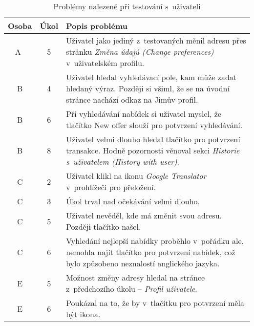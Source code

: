 \begin{table}[h]
    \caption{Problémy nalezené při testování s~uživateli}\label{tab:test-results}
    \begin{tabulary}{1.0\textwidth}{|c|c|L|}
        \hline
        \textbf{Osoba} & \textbf{Úkol} & \textbf{Popis problému} \\ \hline\hline
        A~& 5 & Uživatel jako jediný z~testovaných měnil adresu přes stránku \textit{Změna údajů (Change preferences)} v~uživatelském profilu. \\ \hline

        B & 4 & Uživatel hledal vyhledávací pole, kam může zadat hledaný výraz. Později si všiml, že se na úvodní stránce nachází odkaz na Jimův profil. \\ \hline
        B & 6 & Při vyhledávání nabídek si uživatel myslel, že tlačítko New offer slouží pro potvrzení vyhledávání. \\ \hline
        B & 8 & Uživatel velmi dlouho hledal tlačítko pro potvrzení transakce. Hodně pozornosti věnoval sekci \textit{Historie s~uživatelem (History with user)}. \\ \hline

        C & 2 & Uživatel klikl na ikonu \textit{Google Translator} v~prohlížeči pro přeložení.  \\ \hline
        C & 3 & Úkol trval nad očekávání velmi dlouho.  \\ \hline
        C & 5 & Uživatel nevěděl, kde má změnit svou adresu. Později tlačítko našel.  \\ \hline
        C & 6 & Vyhledání nejlepší nabídky proběhlo v~pořádku ale, nemohla najít tlačítko pro potvrzení nabídek, což bylo způsobeno neznalostí anglického jazyka. \\ \hline

        E & 5 & Možnost změny adresy hledal na stránce z~předchozího úkolu -- \textit{Profil uživatele}.  \\ \hline
        E & 6 & Poukázal na to, že by v~tlačítku pro potvrzení měla být ikona.  \\ \hline
    \end{tabulary}
\end{table}
